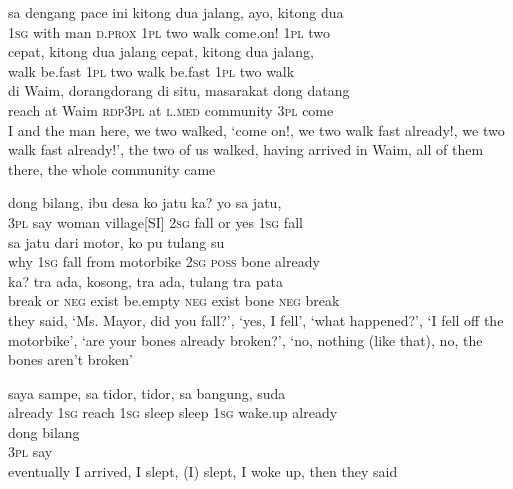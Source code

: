 \ea
\gll   sa    {dengang}    {pace}    {ini}    {kitong}    {dua}    {jalang,}    {ayo,}    {kitong}   dua\\
  \textsc{1sg}    {with}    {man}    {\textsc{d.prox}}    {\textsc{1pl}}    {two}    {walk}    {come.on!}    {\textsc{1pl}}   two\\
    {cepat,}    {kitong}    {dua}    {jalang}    {cepat,}    {kitong}    {dua}    {jalang,}\\
   {walk}    {be.fast}    {\textsc{1pl}}    {two}    {walk}    {be.fast}    {\textsc{1pl}}    {two}    {walk}\\
    {di}    {Waim,}    {dorang{\Tilde}dorang}   di    {situ,}    {masarakat}    {dong}   datang\\
   {reach}    {at}    {Waim}    {\textsc{rdp}{\Tilde}\textsc{3pl}}   at    {\textsc{l.med}}    {community}    {\textsc{3pl}}   come\\
\glt
I and the man here, we two walked, ‘come on!, we two walk fast already!, we two walk fast already!’, the two of us walked, having arrived in Waim, all of them there, the whole community came
\z

\ea
\gll   dong    {bilang,}    {ibu}    {desa}    {ko}    {jatu}    {ka?}    {yo}   sa   jatu,\\
  \textsc{3pl}    {say}    {woman}    {village[SI]}    {\textsc{2sg}}    {fall}    {or}    {yes}   \textsc{1sg}   fall\\
    {sa}    {jatu}    {dari}    {motor,}    {ko}    {pu}    {tulang}    {su}\\
   {why}    {\textsc{1sg}}    {fall}    {from}    {motorbike}    {\textsc{2sg}}    {\textsc{poss}}    {bone}    {already}\\
    {ka?}    {tra}    {ada,}    {kosong,}    {tra}    {ada,}    {tulang}    {tra}    {pata}\\
   {break}    {or}    {\textsc{neg}}    {exist}    {be.empty}    {\textsc{neg}}    {exist}    {bone}    {\textsc{neg}}    {break}\\
\glt
they said, ‘Ms. Mayor, did you fall?’, ‘yes, I fell’, ‘what happened?’, ‘I fell off the motorbike’, ‘are your bones already broken?’, ‘no, nothing (like that), no, the bones aren’t broken’
\z

\ea
{}   saya   sampe,   sa   tidor,   tidor,   sa   bangung,   suda\\
   {already}   \textsc{1sg}   reach   \textsc{1sg}   sleep   sleep   \textsc{1sg}   wake.up   already\\
\gll dong    {bilang}\\
  \textsc{3pl}    {say}\\
\glt
eventually I arrived, I slept, (I) slept, I woke up, then they said
\z

